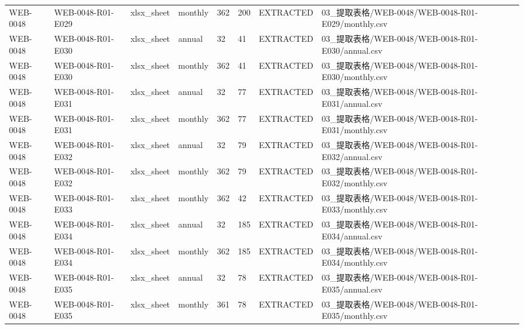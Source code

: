\begin{landscape}
\begin{longtable}{p{1.8cm}p{2.2cm}p{3.1cm}p{4.7cm}p{1.3cm}p{1.3cm}p{3.0cm}p{5.3cm}}
WEB-0048 & WEB-0048-R01-E029 & xlsx\_\allowbreak{}sheet & monthly & 362 & 200 & EXTRACTED & 03\_\allowbreak{}提取表格/\allowbreak{}WEB-0048/\allowbreak{}WEB-0048-R01-E029/\allowbreak{}monthly.csv\\
WEB-0048 & WEB-0048-R01-E030 & xlsx\_\allowbreak{}sheet & annual & 32 & 41 & EXTRACTED & 03\_\allowbreak{}提取表格/\allowbreak{}WEB-0048/\allowbreak{}WEB-0048-R01-E030/\allowbreak{}annual.csv\\
WEB-0048 & WEB-0048-R01-E030 & xlsx\_\allowbreak{}sheet & monthly & 362 & 41 & EXTRACTED & 03\_\allowbreak{}提取表格/\allowbreak{}WEB-0048/\allowbreak{}WEB-0048-R01-E030/\allowbreak{}monthly.csv\\
WEB-0048 & WEB-0048-R01-E031 & xlsx\_\allowbreak{}sheet & annual & 32 & 77 & EXTRACTED & 03\_\allowbreak{}提取表格/\allowbreak{}WEB-0048/\allowbreak{}WEB-0048-R01-E031/\allowbreak{}annual.csv\\
WEB-0048 & WEB-0048-R01-E031 & xlsx\_\allowbreak{}sheet & monthly & 362 & 77 & EXTRACTED & 03\_\allowbreak{}提取表格/\allowbreak{}WEB-0048/\allowbreak{}WEB-0048-R01-E031/\allowbreak{}monthly.csv\\
WEB-0048 & WEB-0048-R01-E032 & xlsx\_\allowbreak{}sheet & annual & 32 & 79 & EXTRACTED & 03\_\allowbreak{}提取表格/\allowbreak{}WEB-0048/\allowbreak{}WEB-0048-R01-E032/\allowbreak{}annual.csv\\
WEB-0048 & WEB-0048-R01-E032 & xlsx\_\allowbreak{}sheet & monthly & 362 & 79 & EXTRACTED & 03\_\allowbreak{}提取表格/\allowbreak{}WEB-0048/\allowbreak{}WEB-0048-R01-E032/\allowbreak{}monthly.csv\\
WEB-0048 & WEB-0048-R01-E033 & xlsx\_\allowbreak{}sheet & monthly & 362 & 42 & EXTRACTED & 03\_\allowbreak{}提取表格/\allowbreak{}WEB-0048/\allowbreak{}WEB-0048-R01-E033/\allowbreak{}monthly.csv\\
WEB-0048 & WEB-0048-R01-E034 & xlsx\_\allowbreak{}sheet & annual & 32 & 185 & EXTRACTED & 03\_\allowbreak{}提取表格/\allowbreak{}WEB-0048/\allowbreak{}WEB-0048-R01-E034/\allowbreak{}annual.csv\\
WEB-0048 & WEB-0048-R01-E034 & xlsx\_\allowbreak{}sheet & monthly & 362 & 185 & EXTRACTED & 03\_\allowbreak{}提取表格/\allowbreak{}WEB-0048/\allowbreak{}WEB-0048-R01-E034/\allowbreak{}monthly.csv\\
WEB-0048 & WEB-0048-R01-E035 & xlsx\_\allowbreak{}sheet & annual & 32 & 78 & EXTRACTED & 03\_\allowbreak{}提取表格/\allowbreak{}WEB-0048/\allowbreak{}WEB-0048-R01-E035/\allowbreak{}annual.csv\\
WEB-0048 & WEB-0048-R01-E035 & xlsx\_\allowbreak{}sheet & monthly & 361 & 78 & EXTRACTED & 03\_\allowbreak{}提取表格/\allowbreak{}WEB-0048/\allowbreak{}WEB-0048-R01-E035/\allowbreak{}monthly.csv\\

\end{longtable}
\end{landscape}
